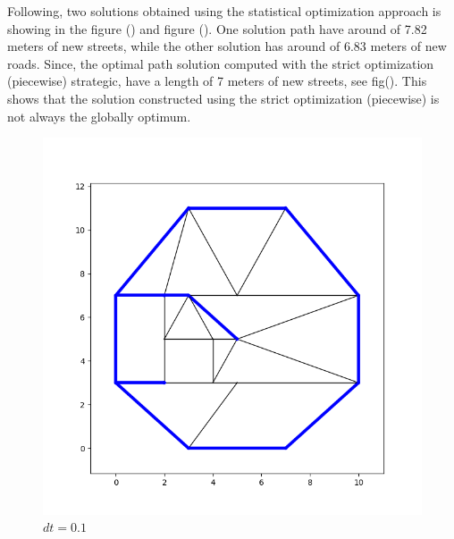 \documentclass[10pt]{article}
\begin{document}
Following, two solutions obtained using the statistical optimization approach is showing in the figure () and figure (). One solution path have around of 7.82 meters of new streets, while the other solution has around of 6.83 meters of new roads. Since, the optimal path solution computed with the strict optimization (piecewise) strategic, have a length of 7 meters of new streets, see fig(). This shows that the solution constructed using the strict optimization (piecewise) is not always the globally optimum.

\begin{figure}[H]
    \centering
    \begin{minipage}{.45\linewidth}
        \centering
        \includegraphics[width=1\textwidth]{images/Figure_14.png}
        \caption{$dt=0.1$}
        \label{fig:prob1_6_2}
    \end{minipage}%
    \begin{minipage}{.45\linewidth}
        \centering

\end{minipage}
\end{figure}
\end{document}
